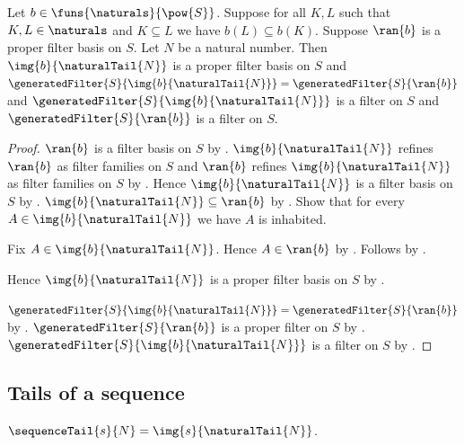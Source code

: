 \begin{theorem}\label{antitone_natural_tail_range_is_filter_basis}
    Let $b\in\funs{\naturals}{\pow{S}}$.
    Suppose for all $K,L$ such that $K,L\in\naturals$ and $K\subseteq L$
        we have $b(L)\subseteq b(K)$.
    Suppose $\ran{b}$ is a proper filter basis on $S$.
    Let $N$ be a natural number.
    Then $\img{b}{\naturalTail{N}}$ is a proper filter basis on $S$ and
        $\generatedFilter{S}{\img{b}{\naturalTail{N}}}
            =\generatedFilter{S}{\ran{b}}$ and
        $\generatedFilter{S}{\img{b}{\naturalTail{N}}}$
            is a filter on $S$ and
        $\generatedFilter{S}{\ran{b}}$ is a filter on $S$.
\end{theorem}
\begin{proof}
    $\ran{b}$ is a filter basis on $S$ by
        .
    $\img{b}{\naturalTail{N}}$ refines $\ran{b}$
        as filter families on $S$ and
        $\ran{b}$ refines $\img{b}{\naturalTail{N}}$
        as filter families on $S$ by
        .
    Hence $\img{b}{\naturalTail{N}}$ is a filter basis on $S$ by
        .
    $\img{b}{\naturalTail{N}}\subseteq\ran{b}$ by
        .
    Show that for every $A\in\img{b}{\naturalTail{N}}$ we have
        $A$ is inhabited.
    \begin{subproof}
        Fix $A\in\img{b}{\naturalTail{N}}$.
        Hence $A\in\ran{b}$ by .
        Follows by .
    \end{subproof}
    Hence $\img{b}{\naturalTail{N}}$ is a proper filter basis on $S$ by
        .

    $\generatedFilter{S}{\img{b}{\naturalTail{N}}}
        =\generatedFilter{S}{\ran{b}}$ by
        .
    $\generatedFilter{S}{\ran{b}}$ is a proper filter on $S$
        by .
    $\generatedFilter{S}{\img{b}{\naturalTail{N}}}$ is a filter on $S$
        by .
\end{proof}

\subsection{Tails of a sequence}

\begin{definition}\label{sequence_tail}
    $\sequenceTail{s}{N}=\img{s}{\naturalTail{N}}$.
\end{definition}

